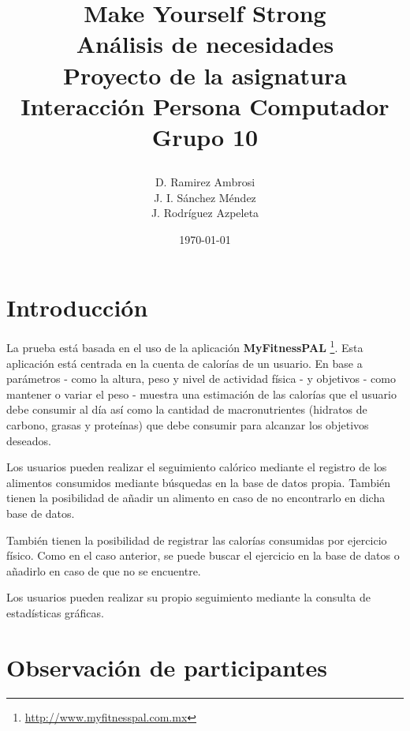 \documentclass[a4paper]{article}
\date{}
\author{D. Ramirez Ambrosi \\ J. I. Sánchez Méndez \\ J. Rodríguez Azpeleta}
\title{\begin{center}
\textbf{\Huge{Make Yourself Strong}} \\ Análisis de necesidades  \\Proyecto de la asignatura Interacción Persona Computador \\ \Huge{Grupo 10}
\end{center}}
\date{\today}
\renewcommand\listfigurename{\centering LISTA DE FIGURAS}
\begin{document}
\maketitle

\thispagestyle{empty}%
\newpage
\tableofcontents%
\thispagestyle{empty}
\newpage





\setcounter{page}{1}%


\section{Introducción}

La prueba está basada en el uso de la aplicación \textbf{MyFitnessPAL} \footnote{\url{http://www.myfitnesspal.com.mx}}. Esta aplicación está centrada en la cuenta de calorías de un usuario. En base a parámetros - como la altura, peso y nivel de actividad física - y objetivos - como mantener o variar el peso - muestra una estimación de las calorías que el usuario debe consumir al día así como la cantidad de macronutrientes (hidratos de carbono, grasas y proteínas) que debe consumir para alcanzar los objetivos deseados.

Los usuarios pueden realizar el seguimiento calórico mediante el registro de los alimentos consumidos mediante búsquedas en la base de datos propia. También tienen la posibilidad de añadir un alimento en caso de no encontrarlo en dicha base de datos.

También tienen la posibilidad de registrar las calorías consumidas por ejercicio físico. Como en el caso anterior, se puede buscar el ejercicio en la base de datos o añadirlo en caso de que no se encuentre.

Los usuarios pueden realizar su propio seguimiento mediante la consulta de estadísticas gráficas.

\section{Observación de participantes}
\end{document}

